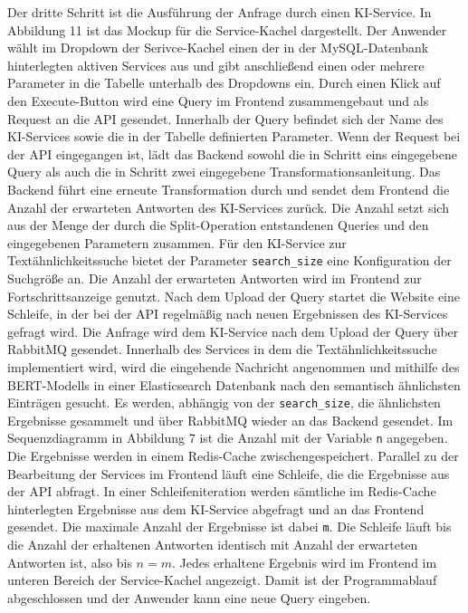 Der dritte Schritt ist die Ausführung der Anfrage durch einen KI-Service. In Abbildung 11 ist das Mockup für die Service-Kachel dargestellt. Der Anwender  wählt im Dropdown der Serivce-Kachel einen der in der MySQL-Datenbank hinterlegten aktiven Services aus und gibt anschließend einen oder mehrere Parameter in die Tabelle unterhalb des Dropdowns ein. Durch einen Klick auf den Execute-Button wird eine Query im Frontend zusammengebaut und als Request an die API gesendet. Innerhalb der Query befindet sich der Name des KI-Services sowie die in der Tabelle definierten Parameter. Wenn der Request bei der API eingegangen ist, lädt das Backend sowohl die in Schritt eins eingegebene Query als auch die in Schritt zwei eingegebene Transformationsanleitung. Das Backend führt eine erneute Transformation durch und sendet dem Frontend die Anzahl der erwarteten Antworten des KI-Services zurück. Die Anzahl setzt sich aus der Menge der durch die Split-Operation entstandenen Queries und den eingegebenen Parametern zusammen. Für den KI-Service zur Textähnlichkeitssuche bietet der Parameter \texttt{search\_{}size} eine Konfiguration der Suchgröße an. Die Anzahl der erwarteten Antworten wird im Frontend zur Fortschrittsanzeige genutzt. Nach dem Upload der Query startet die Website eine Schleife, in der bei der API regelmäßig nach neuen Ergebnissen des KI-Services gefragt wird. Die Anfrage wird dem KI-Service nach dem Upload der Query über RabbitMQ gesendet. Innerhalb des Services in dem die Textähnlichkeitssuche  implementiert wird, wird die eingehende Nachricht angenommen und mithilfe des BERT-Modells in einer Elasticsearch Datenbank nach den semantisch ähnlichsten Einträgen gesucht. Es werden, abhängig von der \texttt{search\_{}size}, die ähnlichsten Ergebnisse gesammelt und über RabbitMQ wieder an das Backend gesendet. Im Sequenzdiagramm in Abbildung 7 ist die Anzahl mit der Variable \texttt{n} angegeben. Die Ergebnisse werden in einem Redis-Cache zwischengespeichert. Parallel zu der Bearbeitung der Services im Frontend läuft eine Schleife, die die Ergebnisse aus der API abfragt. In einer Schleifeniteration werden sämtliche im Redis-Cache hinterlegten Ergebnisse aus dem KI-Service abgefragt und an das Frontend gesendet. Die maximale Anzahl der Ergebnisse ist dabei \texttt{m}. Die Schleife läuft bis die Anzahl der erhaltenen Antworten identisch mit Anzahl der erwarteten Antworten ist, also bis $n=m$. Jedes erhaltene Ergebnis wird im Frontend im unteren Bereich der Service-Kachel angezeigt. Damit ist der Programmablauf abgeschlossen und der Anwender kann eine neue Query eingeben.

